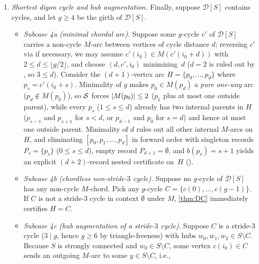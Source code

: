 \begin{outline}
\begin{enumerate}
  must visit some $v \in S_k$ with $\card{M(v)} = 3$, whose predecessor $u \in S_k$ on the cycle satisfies $v \in M(u)$ and
  hence $u \in M(v)$ by $\ClassS$, forming a monochromatic digon inside $S_k$. Thus each $S_k$ is $M$-acyclic, so printing
  $S_0$ and $S_1$ in topological order with $b = 1 - \kappa$ gives a global $2$-record certificate on $H = S$.
\item \emph{Shortest digon cycle and hub augmentation.} Finally, suppose $\mathcal{D}[S]$ contains cycles, and let $g \ge 4$
  be the girth of $\mathcal{D}[S]$.
  \begin{itemize}
  \item \emph{Subcase 4a (minimal chordal arc).} Suppose some $g$-cycle $c'$ of $\mathcal{D}[S]$ carries a non-cycle $M$-arc
    between vertices of cycle distance $d$; reversing $c'$ via  if necessary, we may assume $c'(i_0) \in
    M(c'(i_0 + d))$ with $2 \le d \le \lfloor g/2 \rfloor$, and choose $(d, c', i_0)$ minimizing~$d$ ($d = 2$ is ruled out by
    , so $3 \le d$). Consider the $(d+1)$-vertex arc $H = \{p_0, \dots, p_d\}$ where $p_s = c'(i_0 + s)$.
    Minimality of $g$ makes $p_0 \in M(p_d)$ a \emph{pure one-way} arc ($p_d \notin M(p_0)$), so $\ClassS$ forces
    $\lvert M(p_0) \rvert \le 2$ ($p_1$ plus at most one outside parent), while every $p_s$ ($1 \le s \le d$) already has two
    internal parents in $H$ ($p_{s-1}$ and $p_{s+1}$ for $s < d$, or $p_{d-1}$ and $p_0$ for $s = d$) and hence at most one
    outside parent. Minimality of $d$ rules out all other internal $M$-arcs on $H$, and eliminating $[p_0, p_1, \dots, p_d]$
    in forward order with singleton records $P_s = \{p_s\}$ ($0 \le s \le d$), empty record $P_{d+1} = \emptyset$, and
    $b(p_s) = s + 1$ yields an explicit $(d+2)$-record nested certificate on~$H$ ().
  \item \emph{Subcase 4b (chordless non-stride-$3$ cycle).} Suppose no $g$-cycle of $\mathcal{D}[S]$ has any non-cycle
    $M$-chord. Pick any $g$-cycle $C = \{c(0), \dots, c(g-1)\}$. If $C$ is not a stride-$3$ cycle in context $\emptyset$
    under $M$, \cref{thm:DC} immediately certifies $H = C$.
  \item \emph{Subcase 4c (hub augmentation of a stride-$3$ cycle).} Suppose $C$ is a stride-$3$ cycle ($3 \mid g$, hence
    $g \ge 6$ by triangle-freeness) with hubs $w_0, w_1, w_2 \in S \setminus C$. Because $S$ is strongly connected and
    $w_0 \in S \setminus C$, some vertex $c(i_0) \in C$ sends an outgoing $M$-arc to some $y \in S \setminus C$, i.e.,

\end{itemize}
\end{enumerate}
\end{outline}
